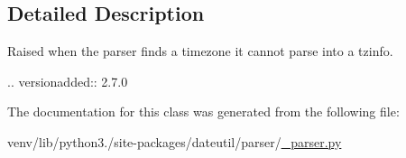 \subsection{Detailed Description}
\begin{DoxyVerb}Raised when the parser finds a timezone it cannot parse into a tzinfo.

.. versionadded:: 2.7.0
\end{DoxyVerb}
 

The documentation for this class was generated from the following file\+:\begin{DoxyCompactItemize}
\item 
venv/lib/python3./site-\/packages/dateutil/parser/\hyperlink{dateutil_2parser_2__parser_8py}{\+\_\+parser.\+py}\end{DoxyCompactItemize}
